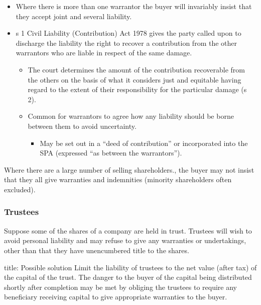 \documentclass[
]{article}
\newenvironment{Shaded}{}{}
\newcommand{\NormalTok}[1]{#1}
\providecommand{\tightlist}{%
  \setlength{\itemsep}{0pt}\setlength{\parskip}{0pt}}
\begin{document}
\begin{itemize}
\tightlist
\item
  Where there is more than one warrantor the buyer will invariably
  insist that they accept joint and several liability.
\item
  s 1 Civil Liability (Contribution) Act 1978 gives the party called
  upon to discharge the liability the right to recover a contribution
  from the other warrantors who are liable in respect of the same
  damage.

  \begin{itemize}
  \tightlist
  \item
    The court determines the amount of the contribution recoverable from
    the others on the basis of what it considers just and equitable
    having regard to the extent of their responsibility for the
    particular damage (s 2).
  \item
    Common for warrantors to agree how any liability should be borne
    between them to avoid uncertainty.

    \begin{itemize}
    \tightlist
    \item
      May be set out in a ``deed of contribution'' or incorporated into
      the SPA (expressed ``as between the warrantors'').
    \end{itemize}
  \end{itemize}
\end{itemize}

Where there are a large number of selling shareholders., the buyer may
not insist that they all give warranties and indemnities (minority
shareholders often excluded).

\hypertarget{trustees}{%
\subsubsection{Trustees}\label{trustees}}

Suppose some of the shares of a company are held in trust. Trustees will
wish to avoid personal liability and may refuse to give any warranties
or undertakings, other than that they have unencumbered title to the
shares.

\begin{Shaded}
\begin{Highlighting}[]
\NormalTok{title: Possible solution}
\NormalTok{Limit the liability of trustees to the net value (after tax) of the capital of the trust. The danger to the buyer of the capital being distributed shortly after completion may be met by obliging the trustees to require any beneficiary receiving capital to give appropriate warranties to the buyer.}
\end{Highlighting}
\end{Shaded}
\end{document}
